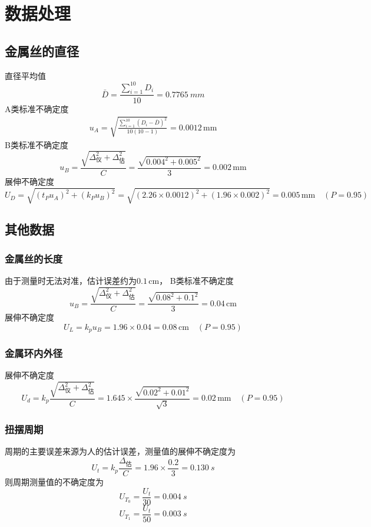 \documentclass{article}
\begin{document}
\section*{数据处理}

\subsection*{金属丝的直径}
直径平均值\[\bar{D}=\frac{\sum_{i=1}^{10}D_i}{10}=\SI{0.7765}{mm}\]
A类标准不确定度\[\begin{aligned}
    u_A=\sqrt{\frac{\sum_{i=1}^{10} (D_i-\bar{D})^2}{10(10-1)}}=0.0012\,\mathrm{mm}
\end{aligned}\]
B类标准不确定度
\[u_B=\frac{\sqrt{\Delta_\text{仪}^2+\Delta_\text{估}^2}}{C}=\frac{\sqrt{0.004^2+0.005^2}}{3}=0.002\,\mathrm{mm}\]
展伸不确定度
$$
        U_{D} =\sqrt{\left(t_Pu_A\right)^2+\left(k_Pu_B\right)^2}=\sqrt{\left(2.26\times{0.0012}\right)^2+\left(1.96\times{0.002}\right)^2}=0.005\,\mathrm{mm}\quad(P=0.95)
$$

\subsection*{其他数据}
\subsubsection*{金属丝的长度}
由于测量时无法对准，估计误差约为$0.1\,\mathrm{cm}$，
B类标准不确定度
\[u_B=\frac{\sqrt{\Delta_\text{仪}^2+\Delta_\text{估}^2}}{C}=\frac{\sqrt{0.08^2+0.1^2}}{3}=0.04\,\mathrm{cm}\]
展伸不确定度 
$$
U_{L}=k_p u_B=1.96\times 0.04=0.08\,\mathrm{cm}  \quad(P=0.95)    
$$
\subsubsection*{金属环内外径}
展伸不确定度 
$$
U_{d}=k_p \frac{\sqrt{\Delta_\text{仪}^2+\Delta_\text{估}^2}}{C}=1.645\times \frac{\sqrt{0.02^2+0.01^2}}{\sqrt{3}}=0.02\,\mathrm{mm}  \quad(P=0.95)    
$$
\subsubsection*{扭摆周期}
周期的主要误差来源为人的估计误差，测量值的展伸不确定度为
\[U_t=k_p\frac{\Delta_{估}}{C}=1.96\times\frac{0.2}{3}=\SI{0.130}{s}\]
则周期测量值的不确定度为
\[U_{T_0}=\frac{U_t}{30}=\SI{0.004}{s}\]
\[U_{T_1}=\frac{U_t}{50}=\SI{0.003}{s}\]
\end{document}
